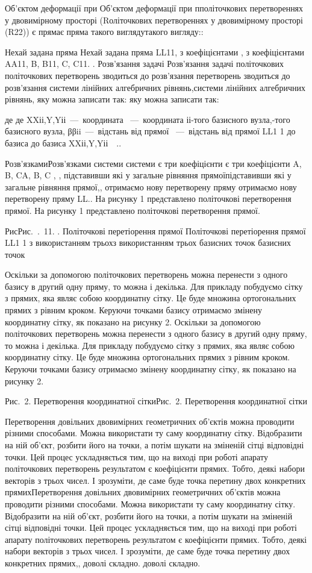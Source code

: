 \documentclass[12pt,a4paper]{article}
\begin{document}
\par
Об’єктом деформації при Об’єктом деформації при пполіточкових перетвореннях у двовимірному просторі (Rоліточкових перетвореннях у двовимірному просторі (R22))  є прямає пряма  такого виглядутакого вигляду::
\par
Нехай задана пряма Нехай задана пряма LL11, з коефіцієнтами , з коефіцієнтами AA11, B, B11, C, C11. . Розв’язання задачі Розв’язання задачі політочкових політочкових перетворень зводиться до розв’язання перетворень зводиться до розв’язання системи лінійних алгебричних рівнянь,системи лінійних алгебричних рівнянь, яку можна записати так: яку можна записати так:
\par
де де XXіі,Y,Yіі — координата  — координата іі-того базисного вузла,-того базисного вузла,  ββii — відстань від прямої  — відстань від прямої LL1 1 до базиса до базиса XXіі,Y,Yіі  ..
\par
Розв’язкамиРозв’язками системи  системи є три коефіцієнти є три коефіцієнти A, B, CA, B, C  , , підставивши які у загальне рівняння прямоїпідставивши які у загальне рівняння прямої,,  отримаємо нову перетворену пряму отримаємо нову перетворену пряму LL.. На рисунку 1 представлено політочкові перетворення прямої.  На рисунку 1 представлено політочкові перетворення прямої.
\par
РисРис. . 11. . Політочкові перетіорення прямої Політочкові перетіорення прямої LL1 1 з використанням трьохз використанням трьох базисних точок базисних точок
\par
Оскільки за допомогою політочкових перетворень можна перенести з одного базису в другий одну пряму, то можна і декілька. Для прикладу побудуємо сітку з прямих, яка являє собою координатну сітку. Це буде множина ортогональних прямих з рівним кроком. Керуючи точками базису отримаємо змінену координатну сітку, як показано на рисунку 2. Оскільки за допомогою політочкових перетворень можна перенести з одного базису в другий одну пряму, то можна і декілька. Для прикладу побудуємо сітку з прямих, яка являє собою координатну сітку. Це буде множина ортогональних прямих з рівним кроком. Керуючи точками базису отримаємо змінену координатну сітку, як показано на рисунку 2.
\par
Рис. 2. Перетворення координатної сіткиРис. 2. Перетворення координатної сітки
\par
Перетворення довільних двовимірних геометричних об’єктів можна проводити різними способами. Можна використати ту саму координатну сітку. Відобразити на ній об’єкт, розбити його на точки, а потім шукати на зміненій сітці відповідні точки. Цей процес ускладняється тим, що на виході при роботі апарату політочкових перетворень результатом є коефіцієнти прямих. Тобто, деякі набори векторів з трьох чисел. І зрозуміти, де саме буде точка перетину двох конкретних прямихПеретворення довільних двовимірних геометричних об’єктів можна проводити різними способами. Можна використати ту саму координатну сітку. Відобразити на ній об’єкт, розбити його на точки, а потім шукати на зміненій сітці відповідні точки. Цей процес ускладняється тим, що на виході при роботі апарату політочкових перетворень результатом є коефіцієнти прямих. Тобто, деякі набори векторів з трьох чисел. І зрозуміти, де саме буде точка перетину двох конкретних прямих,, доволі складно.  доволі складно.
\end{document}

